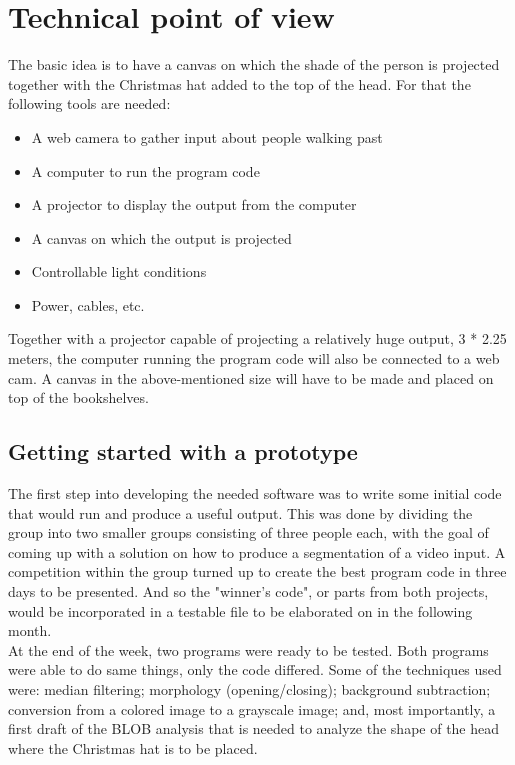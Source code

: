 \section{Technical point of view}
The basic idea is to have a canvas on which the shade of the person is projected together with the Christmas hat added to the top of the head. For that the following tools are needed:

\begin{itemize}
\item A web camera to gather input about people walking past
\item A computer to run the program code
\item A projector to display the output from the computer
\item A canvas on which the output is projected
\item Controllable light conditions
\item Power, cables, etc.
\end{itemize}

Together with a projector capable of projecting a relatively huge output, 3 * 2.25 meters, the computer running the program code will also be connected to a web cam. A canvas in the above-mentioned size will have to be made and placed on top of the bookshelves.

\subsection{Getting started with a prototype}
The first step into developing the needed software was to write some initial code that would run and produce a useful output. This was done by dividing the group into two smaller groups consisting of three people each, with the goal of coming up with a solution on how to produce a segmentation of a video input. A competition within the group turned up to create the best program code in three days to be presented. And so the "winner's code", or parts from both projects, would be incorporated in a testable file to be elaborated on in the following month.\\
At the end of the week, two programs were ready to be tested. Both programs were able to do same things, only the code differed. Some of the techniques used were: median filtering; morphology (opening/closing); background subtraction; conversion from a colored image to a grayscale image; and, most importantly, a first draft of the BLOB analysis that is needed to analyze the shape of the head where the Christmas hat is to be placed.\\

